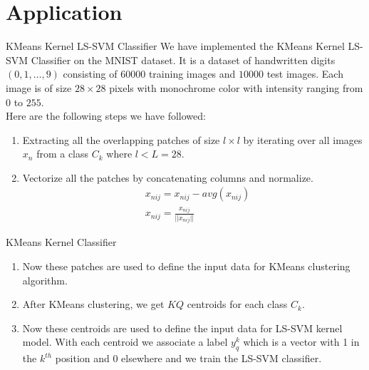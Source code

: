 \documentclass{beamer}
\newcounter{saveenumi}
\newcommand{\seti}{\setcounter{saveenumi}{\value{enumi}}}
\newcommand{\conti}{\setcounter{enumi}{\value{saveenumi}}}
\begin{document}
\section{Application}
\begin{frame}{KMeans Kernel LS-SVM Classifier}
We have implemented the KMeans Kernel LS-SVM Classifier on the MNIST dataset.
It is a dataset of handwritten digits $(0,1,\ldots,9)$ consisting of $60000$ training images and $10000$ test images.  Each image is of size $28 \times 28$ pixels with monochrome color with intensity ranging from $0$ to $255$. \\ \quad Here are the following steps we have followed: \\
\begin{enumerate}
    \item Extracting all the overlapping patches of size $l \times l$ by iterating over all images $x_{n}$ from a class $C_{k}$ where $l<L=28$.
    \item Vectorize all the patches by concatenating columns and normalize.
    \begin{align*}
    & x_{nij} = x_{nij} - avg(x_{nij}) \\
    & x_{nij} = \frac{x_{nij}}{||x_{nij}||}
    \end{align*}
    \seti
\end{enumerate}
\end{frame}
\begin{frame}{KMeans Kernel Classifier}
\begin{enumerate}
\conti
    \item Now these patches are used to define the input data for KMeans clustering algorithm.
    \item After KMeans clustering, we get $KQ$ centroids for each class $C_{k}$.
    \item Now these centroids are used to define the input data for LS-SVM kernel model. With each centroid we associate a label $y_{q}^{k}$ which is a vector with 1 in the $k^{th}$ position and $0$ elsewhere and we train the LS-SVM classifier.
\end{enumerate}
\end{frame}
\end{document}
